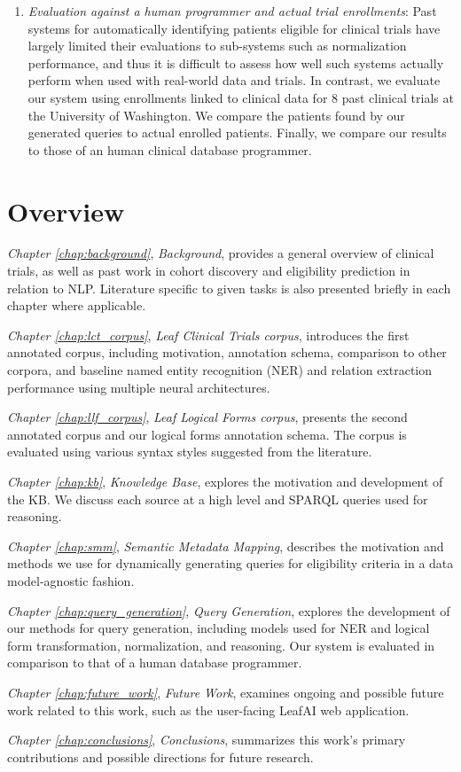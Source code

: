 \documentclass[../main.tex]{subfiles}
\begin{document}
\begin{enumerate}
    \item \textit{Evaluation against a human programmer and actual trial enrollments}: Past systems for automatically identifying patients eligible for clinical trials have largely limited their evaluations to sub-systems such as normalization performance, and thus it is difficult to assess how well such systems actually perform when used with real-world data and trials. In contrast, we evaluate our system using enrollments linked to clinical data for 8 past clinical trials at the University of Washington. We compare the patients found by our generated queries to actual enrolled patients. Finally, we compare our results to those of an human clinical database programmer.
\end{enumerate}

\section{Overview}

\textit{Chapter \ref{chap:background}}, \textit{Background}, provides a general overview of clinical trials, as well as past work in cohort discovery and eligibility prediction in relation to NLP. Literature specific to given tasks is also presented briefly in each chapter where applicable. 

\textit{Chapter \ref{chap:lct_corpus}}, \textit{Leaf Clinical Trials corpus}, introduces the first annotated corpus, including motivation, annotation schema, comparison to other corpora, and baseline named entity recognition (NER) and relation extraction performance using multiple neural architectures.

\textit{Chapter \ref{chap:llf_corpus}}, \textit{Leaf Logical Forms corpus}, presents the second annotated corpus and our logical forms annotation schema. The corpus is evaluated using various syntax styles suggested from the literature.

\textit{Chapter \ref{chap:kb}}, \textit{Knowledge Base}, explores the motivation and development of the KB. We discuss each source at a high level and SPARQL queries used for reasoning.

\textit{Chapter \ref{chap:smm}}, \textit{Semantic Metadata Mapping}, describes the motivation and methods we use for dynamically generating queries for eligibility criteria in a data model-agnostic fashion.

\textit{Chapter \ref{chap:query_generation}}, \textit{Query Generation}, explores the development of our methods for query generation, including models used for NER and logical form transformation, normalization, and reasoning. Our system is evaluated in comparison to that of a human database programmer.

\textit{Chapter \ref{chap:future_work}}, \textit{Future Work}, examines ongoing and possible future work related to this work, such as the user-facing LeafAI web application.

\textit{Chapter \ref{chap:conclusions}}, \textit{Conclusions}, summarizes this work's primary contributions and possible directions for future research.
\end{document}
